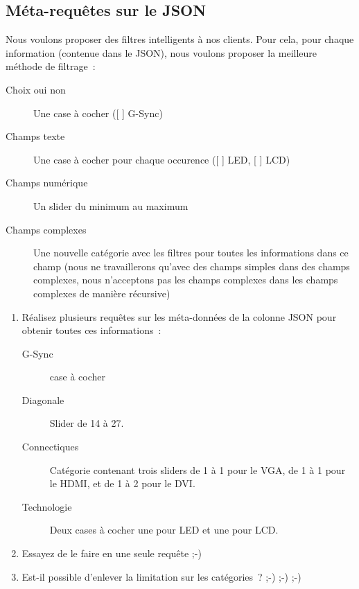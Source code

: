 \documentclass[a4paper,10pt]{article}
\begin{document}
  \subsection{Méta-requêtes sur le JSON}
    Nous voulons proposer des filtres intelligents à nos clients. Pour cela, pour chaque information (contenue dans le JSON), nous voulons proposer la meilleure méthode de filtrage :
    \begin{description}
        \item[Choix oui non] Une case à cocher ([ ] G-Sync)
        \item[Champs texte] Une case à cocher pour chaque occurence ([ ] LED, [ ] LCD)
        \item[Champs numérique] Un slider du minimum au maximum
        \item[Champs complexes] Une nouvelle catégorie avec les filtres pour toutes les informations dans ce champ (nous ne travaillerons qu'avec des champs simples dans des champs complexes, nous n'acceptons pas les champs complexes dans les champs complexes de manière récursive)
   \end{description}

    \begin{enumerate}
      \item Réalisez plusieurs requêtes sur les méta-données de la colonne JSON pour obtenir toutes ces informations :
      \begin{description}
          \item[G-Sync] case à cocher
          \item[Diagonale] Slider de 14 à 27.
          \item[Connectiques] Catégorie contenant trois sliders de 1 à 1 pour le VGA, de 1 à 1 pour le HDMI, et de 1 à 2 pour le DVI.
          \item[Technologie] Deux cases à cocher une pour LED et une pour LCD.
     \end{description}
      \item Essayez de le faire en une seule requête ;-)
      \item Est-il possible d'enlever la limitation sur les catégories ? ;-) ;-) ;-)
    \end{enumerate}
\end{document}
